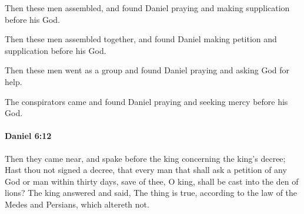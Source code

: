 			Then these men assembled, and found Daniel praying and making supplication before his God.

			\begin{versebox}
					\item[BHS] 
					\item[LXX] 
					\item[ASV] Then these men assembled together, and found Daniel making petition and supplication before his God.
					\item[NIV] Then these men went as a group and found Daniel praying and asking God for help.
					\item[NRSV] The conspirators came and found Daniel praying and seeking mercy before his God.
			\end{versebox}

		\paragraph{Daniel 6:12} %
			\label{DANIEL-6-12}

			Then they came near, and spake before the king concerning the king’s decree; Hast thou not signed a decree, that every man that shall ask a petition of any God or man within thirty days, save of thee, O king, shall be cast into the den of lions? The king answered and said, The thing is true, according to the law of the Medes and Persians, which altereth not.

